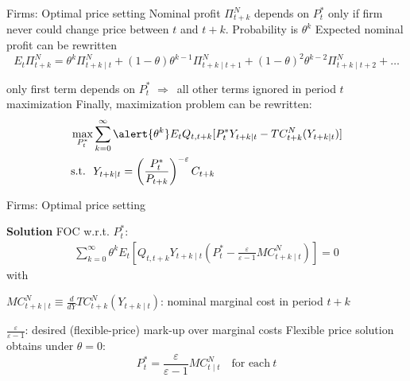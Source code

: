 \documentclass{beamer}
\newenvironment{mytemize}
{\vfill\itemize[nolistsep,itemsep=\fill,label=\color{blue}{$\triangleright$}]}
  {\enditemize}
\newcommand{\rarr}{$\Rightarrow$\ }
\begin{document}
\begin{frame}{Firms: Optimal price setting}
  Nominal profit $\Pi^N_{t+k}$ depends on $P_t^*$ \alert{only if firm never could change price between $t$ and $t+k$}. Probability is $\theta^k$
	\vfill
Expected nominal profit can be rewritten $$E_t \Pi^N_{t+k} = \theta^k \Pi^N_{t+k\mid t} + (1-\theta)\theta^{k-1} \Pi^N_{t+k\mid t+1} + 
  (1-\theta)^2\theta^{k-2} \Pi^N_{t+k\mid t+2} + \dots$$
  \begin{mytemize}
  \item only first term depends on $P^*_t$ \rarr all other terms ignored in period $t$ maximization
  \end{mytemize}
  \vfill
  Finally, maximization problem can be rewritten:
  \begin{align*}
	\max_{P_t^*} &\sum_{k = 0}^{\infty} \alert{\theta^k} E_t Q_{t, t+k} [P^*_t Y_{t+k\mid t}-TC^N_{t+k}(Y_{t+k \mid t})] \\
\text{s.t.} \ \  &Y_{t+k \mid t} = \left( \frac{P^*_{t}}{P_{t+k}}\right)^{-\varepsilon} C_{t+k}
  \end{align*}
\end{frame}
\begin{frame}{Firms: Optimal price setting}


\textbf{Solution} FOC w.r.t. $P^*_t$:
\begin{align}
\sum_{k=0}^{\infty} \theta^k E_t \left[ Q_{t,t+k} Y_{t+k \mid t} (P^*_t - \frac{\varepsilon}{\varepsilon-1} MC^N_{t+k \mid t})\right] = 0 \nonumber
\end{align}
with 
\begin{mytemize}
\small
\item $MC^N_{t+k \mid t} \equiv \frac{d}{d Y}TC^N_{t+k}(Y_{t+k \mid t})$: nominal marginal cost in period $t+k$
\item $\frac{\varepsilon}{\varepsilon-1}$: desired (flexible-price) mark-up over marginal costs 
\end{mytemize}
\vfill
Flexible price solution obtains under $\theta=0$:
\begin{equation*}
  P^*_t = \frac{\varepsilon}{\varepsilon-1} MC^N_{t \mid t} \quad \text{for each}\ t
\end{equation*}
\end{frame}
\end{document}
